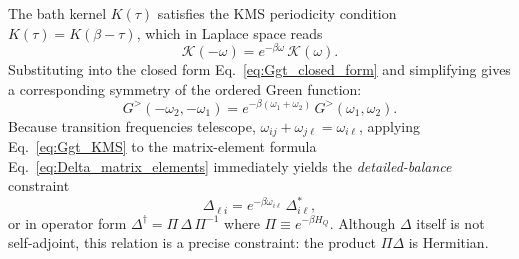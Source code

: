 The bath kernel $K(\tau)$ satisfies the KMS periodicity condition $K(\tau)=K(\beta-\tau)$,
which in Laplace space reads
\begin{equation}
    \mathcal{K}(-\omega) = e^{-\beta\omega}\,\mathcal{K}(\omega).
    \label{eq:KMS_Klaplace}
\end{equation}
Substituting into the closed form Eq.~\eqref{eq:Ggt_closed_form} and simplifying gives a
corresponding symmetry of the ordered Green function:
\begin{equation}
    G^{>}(-\omega_2,-\omega_1) = e^{-\beta(\omega_1+\omega_2)}\,G^{>}(\omega_1,\omega_2).
    \label{eq:Ggt_KMS}
\end{equation}
Because transition frequencies telescope, $\omega_{ij}+\omega_{j\ell}=\omega_{i\ell}$, applying
Eq.~\eqref{eq:Ggt_KMS} to the matrix-element formula Eq.~\eqref{eq:Delta_matrix_elements}
immediately yields the \emph{detailed-balance} constraint
\begin{equation}
    \Delta_{\ell i} = e^{-\beta\omega_{i\ell}}\,\Delta_{i\ell}^{\ast},
    \label{eq:Delta_detailed_balance}
\end{equation}
or in operator form $\Delta^{\dagger}=\Pi\,\Delta\,\Pi^{-1}$ where $\Pi\equiv e^{-\beta H_Q}$.
Although $\Delta$ itself is not self-adjoint, this relation is a precise constraint: the product
$\Pi\Delta$ is Hermitian.

